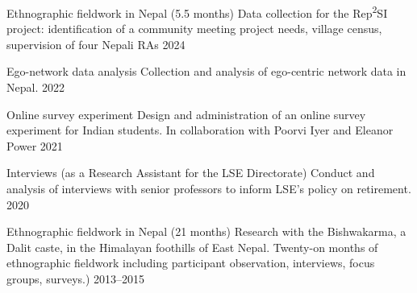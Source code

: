 
\begin{cvexperiences}


  \cvexperience
    {Ethnographic fieldwork in Nepal (5.5 months)} %
    {Data collection for the Rep\textsuperscript{2}SI project: identification of a community meeting project needs, village census, supervision of four Nepali RAs} %
    {2024} %


  \cvexperience
    {Ego-network data analysis} %
    {Collection and analysis of ego-centric network data in Nepal.} %
    {2022} %

  \cvexperience
    {Online survey experiment} %
    {Design and administration of an online survey experiment for Indian students. In collaboration with Poorvi Iyer and Eleanor Power} %
    {2021} %

  \cvexperience
    {Interviews (as a Research Assistant for the LSE Directorate)} %
    {Conduct and analysis of interviews with senior professors to inform LSE's policy on retirement.} %
    {2020} %


  \cvexperience
    {Ethnographic fieldwork in Nepal (21 months)} %
    {Research with the Bishwakarma, a Dalit caste, in the Himalayan foothills of East Nepal. Twenty-on months of ethnographic fieldwork including participant observation, interviews, focus groups, surveys.)} %
    {2013--2015} %

\end{cvexperiences}

